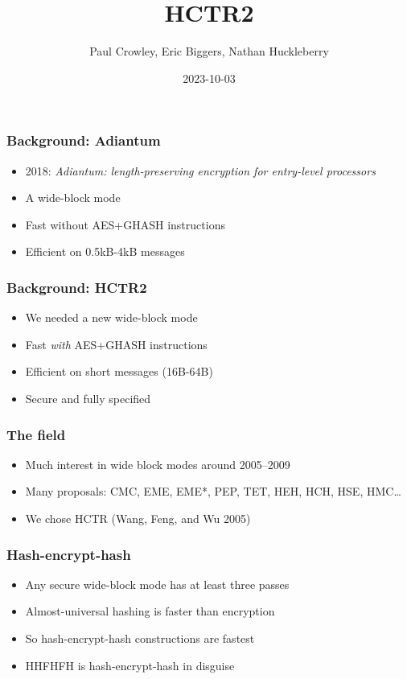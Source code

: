 \documentclass{beamer}
\title{HCTR2}
\author{Paul Crowley, Eric Biggers, Nathan Huckleberry}
\institute{Google LLC}
\date{2023-10-03}
\begin{document}
\frame{\titlepage}

\begin{frame}

\frametitle{Background: Adiantum}

\begin{itemize}
    \item 2018: \textit{Adiantum: length-preserving encryption for entry-level processors}
    \item A wide-block mode
    \item Fast without AES+GHASH instructions
    \item Efficient on 0.5kB-4kB messages
\end{itemize}
\end{frame}

\begin{frame}

    \frametitle{Background: HCTR2}
    
    \begin{itemize}
        \item We needed a new wide-block mode
        \item Fast \textit{with} AES+GHASH instructions
        \item Efficient on short messages (16B-64B)
        \item Secure and fully specified
    \end{itemize}
    \end{frame}
    
    
\begin{frame}

\frametitle{The field}

\begin{itemize}
    \item Much interest in wide block modes around 2005--2009
    \item Many proposals: CMC, EME, EME*, PEP, TET, HEH, HCH, HSE, HMC\ldots
    \item We chose HCTR (Wang, Feng, and Wu 2005)
\end{itemize}
\end{frame}

\begin{frame}

\frametitle{Hash-encrypt-hash}

\begin{itemize}
    \item Any secure wide-block mode has at least three passes
    \item Almost-universal hashing is faster than encryption
    \item So hash-encrypt-hash constructions are fastest
    \item HHFHFH is hash-encrypt-hash in disguise
\end{itemize}
\end{frame}
\end{document}
